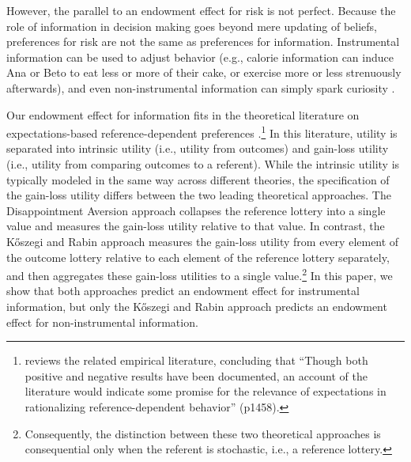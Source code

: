 However, the parallel to an endowment effect for risk is not perfect. Because the role of information in decision making goes beyond mere updating of beliefs, preferences for risk are not the same as preferences for information. Instrumental information can be used to adjust behavior (e.g., calorie information can induce Ana or Beto to eat less or more of their cake, or exercise more or less strenuously afterwards), and even non-instrumental information can simply spark curiosity \citep{loewensteinPsychologyCuriosityReview1994,sharotHowPeopleDecide2020}.


Our endowment effect for information fits in the theoretical literature on expectations-based reference-dependent preferences \citep{marzilliericsonEndowmentEffect2014,odonoghueChapterReferenceDependentPreferences2018}.\footnote{\citet{sprengerEndowmentEffectRisk2015} reviews the related empirical literature, concluding that \enquote{Though both positive and negative results have been documented, an account of the literature would indicate some promise for the relevance of expectations in rationalizing reference-dependent behavior} (p1458).} In this literature, utility is separated into intrinsic utility (i.e., utility from outcomes) and gain-loss utility (i.e., utility from comparing outcomes to a referent). While the intrinsic utility is typically modeled in the same way across different theories, the specification of the gain-loss utility differs between the two leading theoretical approaches. The Disappointment Aversion approach \citep{bellDisappointmentDecisionMaking1985,loomesDisappointmentDynamicConsistency1986,gulTheoryDisappointmentAversion1991} collapses the reference lottery into a single value and measures the gain-loss utility relative to that value. In contrast, the  Kőszegi and Rabin approach \citep{koszegiModelReferenceDependentPreferences2006,koszegiReferenceDependentRiskAttitudes2007} measures the gain-loss utility from every element of the outcome lottery relative to each element of the reference lottery separately, and then aggregates these gain-loss utilities to a single value.\footnote{Consequently, the distinction between these two theoretical approaches is consequential only when the referent is stochastic, i.e., a reference lottery.}  In this paper, we show that both approaches predict an endowment effect for instrumental information, but only the Kőszegi and Rabin approach predicts an endowment effect for non-instrumental information.

